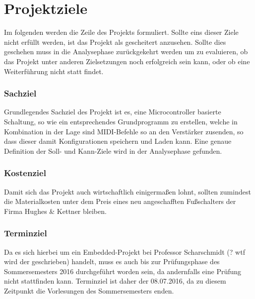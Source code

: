 \chapter{Projektziele}

\begin{flushleft}

Im folgenden werden die Zeile des Projekts formuliert. Sollte eins dieser Ziele nicht erfüllt werden, ist das Projekt als gescheitert anzusehen. Sollte dies geschehen muss in die Analysephase zurückgekehrt werden um zu evaluieren, ob das Projekt unter anderen Zielsetzungen noch erfolgreich sein kann, oder ob eine Weiterführung nicht statt findet.

\end{flushleft}

\subsection{Sachziel}
\begin{flushleft}

Grundlegendes Sachziel des Projekt ist es, eine Microcontroller basierte Schaltung, so wie ein entsprechendes Grundprogramm zu erstellen, welche in Kombination in der Lage sind MIDI-Befehle so an den Verstärker zusenden, so dass dieser damit Konfigurationen speichern und Laden kann. Eine genaue Definition der Soll- und Kann-Ziele wird in der Analysephase gefunden. 
\end{flushleft}
\subsection{Kostenziel}
\begin{flushleft}

Damit sich das Projekt auch wirtschaftlich einigermaßen lohnt, sollten zumindest die Materialkosten unter dem Preis eines neu angeschafften Fußschalters der Firma Hughes \& Kettner bleiben.  

\end{flushleft}


\subsection{Terminziel}

\begin{flushleft}

Da es sich hierbei um ein Embedded-Projekt bei Professor Scharschmidt (? wtf wird der geschrieben) handelt, muss es auch bis zur Prüfungsphase des Sommersemesters 2016 durchgeführt worden sein, da andernfalls eine Prüfung nicht stattfinden kann. Terminziel ist daher der 08.07.2016, da zu diesem Zeitpunkt die Vorlesungen des Sommersemesters enden.

\end{flushleft}


